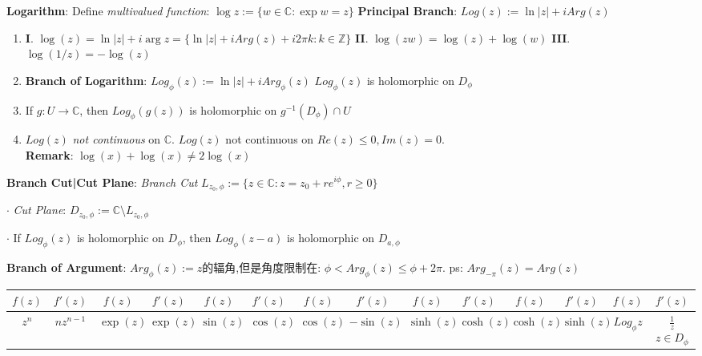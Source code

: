 \documentclass[9pt]{article}
\begin{document}
\textbf{Logarithm}: Define \textit{multivalued function}: $\log{z}:=\{w\in\mathbb{C}:\exp{w}=z\}$ \quad \quad \quad \textbf{Principal Branch}: $Log(z):=\ln|z|+iArg(z)$

\begin{enumerate}[itemsep=-2pt, topsep=-2pt]
    \item \textbf{I}. $\log(z)=\ln |z|+i\arg{z}=\{\ln |z|+iArg(z) +i2\pi k:k\in\mathbb{Z}\}$ \quad \quad \textbf{II}. $\log(zw)=\log(z)+\log(w)$ \quad \quad \textbf{III}. $\log(1/z)=-\log(z)$
    \item \textbf{Branch of Logarithm}: $Log_{\phi}(z):=\ln|z|+iArg_{\phi}(z)$ \quad \quad $Log_\phi(z)$ is holomorphic on $D_{\phi}$ \\
    \noindent
    \vspace{-3cm}
    \item If $g:U\to\mathbb{C}$, then $Log_\phi(g(z))$ is holomorphic on $g^{-1}(D_{\phi})\cap U$
    \item $Log(z)$ \textit{not continuous} on $\mathbb{C}$. \quad \quad $Log(z)$ not continuous on $Re(z)\leq 0,Im(z)=0$. \\
    \textbf{Remark}: $\log(x)+\log(x)\ne 2\log(x)$
\end{enumerate}

\textbf{Branch Cut|Cut Plane}: \textit{Branch Cut} $L_{z_0,\phi}:=\{z\in\mathbb{C}:z=z_0+re^{i\phi},r\geq0\}$

$\cdot$ \textit{Cut Plane}: $D_{z_0,\phi}:=\mathbb{C}\setminus L_{z_0,\phi}$ 

$\cdot$ If $Log_{\phi}(z)$ is holomorphic on $D_{\phi}$, then $Log_{\phi}(z-a)$ is holomorphic on $D_{a,\phi}$

\textbf{Branch of Argument}: $Arg_{\phi}(z):=z${\small 的辐角,但是角度限制在:} $\phi<Arg_\phi(z)\leq \phi+2\pi$. \quad \quad ps: {\footnotesize $Arg_{-\pi}(z)=Arg(z)$}

\vspace{-10pt}
\begin{longtable}{cc|cc|cc|cc|cc|cc|cc}
    $f(z)$ & $f'(z)$ & $f(z)$ & $f'(z)$ & $f(z)$ & $f'(z)$ & $f(z)$ & $f'(z)$ & $f(z)$ & $f'(z)$ & $f(z)$ & $f'(z)$ & $f(z)$ & $f'(z)$ \\
    \hline
    $z^n$ & $nz^{n-1}$ & $\exp(z)$ & $\exp(z)$ & $\sin(z)$ & $\cos(z)$ & $\cos(z)$ & $-\sin(z)$ & $\sinh(z)$ & $\cosh(z)$ & $\cosh(z)$ & $\sinh(z)$ & $Log_\phi z$ & $\frac{1}{z}$ {\tiny $z\in D_{\phi}$} \\
\end{longtable}
\vspace{-10pt}
\end{document}
